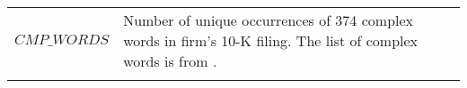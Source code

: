 \begin{landscape}
\begin{ThreePartTable}
\begin{spacing}{1.0}
\begin{longtable}[t]{>{\raggedright\arraybackslash}p{5.2cm}>{\raggedright\arraybackslash}p{15.6cm}}
\addlinespace
$CMP\_WORDS$ & Number of unique occurrences of 374 complex words in firm's 10-K filing. The list of complex words is from \cite{lm_2020_firm_complexity}.\\*
\end{longtable}
\end{spacing}
\end{ThreePartTable}
\endgroup{}
\end{landscape}
\restoregeometry